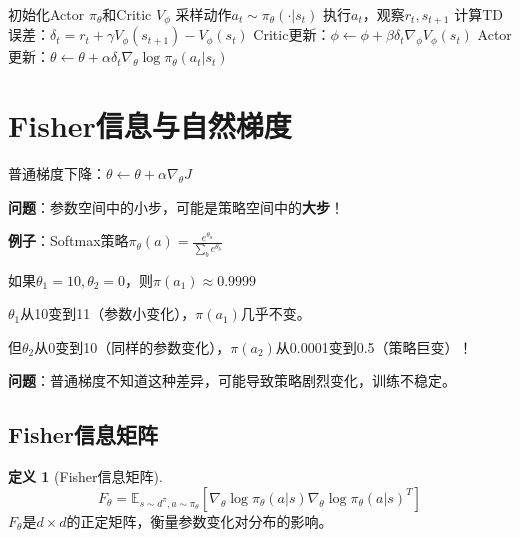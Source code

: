 \documentclass[11pt,a4paper]{article}
\theoremstyle{definition}
\newtheorem{definition}{定义}[section]
\begin{document}
\begin{algorithm}[H]
\caption{Advantage Actor-Critic (A2C)}
\begin{algorithmic}[1]
\State 初始化Actor $\pi_\theta$和Critic $V_\phi$
    \State 采样动作$a_t \sim \pi_\theta(\cdot|s_t)$
    \State 执行$a_t$，观察$r_t, s_{t+1}$
    \State 计算TD误差：$\delta_t = r_t + \gamma V_\phi(s_{t+1}) - V_\phi(s_t)$
    \State Critic更新：$\phi \leftarrow \phi + \beta \delta_t \nabla_\phi V_\phi(s_t)$
    \State Actor更新：$\theta \leftarrow \theta + \alpha \delta_t \nabla_\theta \log \pi_\theta(a_t|s_t)$
\EndFor
\end{algorithmic}
\end{algorithm}

\section{Fisher信息与自然梯度}

\begin{plainwords}[普通梯度的问题]
普通梯度下降：$\theta \leftarrow \theta + \alpha \nabla_\theta J$

\textbf{问题}：参数空间中的小步，可能是策略空间中的\textbf{大步}！

\textbf{例子}：Softmax策略$\pi_\theta(a) = \frac{e^{\theta_a}}{\sum_b e^{\theta_b}}$

如果$\theta_1 = 10, \theta_2 = 0$，则$\pi(a_1) \approx 0.9999$

$\theta_1$从10变到11（参数小变化），$\pi(a_1)$几乎不变。

但$\theta_2$从0变到10（同样的参数变化），$\pi(a_2)$从0.0001变到0.5（策略巨变）！

\textbf{问题}：普通梯度不知道这种差异，可能导致策略剧烈变化，训练不稳定。
\end{plainwords}

\subsection{Fisher信息矩阵}

\begin{definition}[Fisher信息矩阵]
\[
F_\theta = \mathbb{E}_{s \sim d^\pi, a \sim \pi_\theta}\left[\nabla_\theta \log \pi_\theta(a|s) \nabla_\theta \log \pi_\theta(a|s)^T\right]
\]
$F_\theta$是$d \times d$的正定矩阵，衡量参数变化对分布的影响。
\end{definition}
\end{document}

